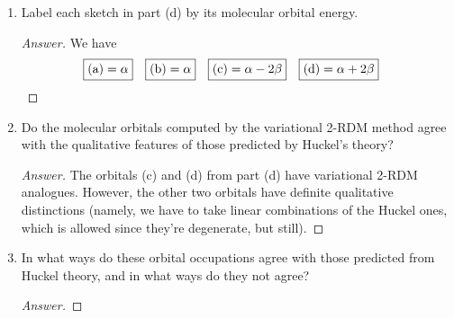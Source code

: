 \documentclass[../psets.tex]{subfiles}
\begin{document}
\begin{enumerate}
\begin{enumerate}
\begin{proof}[Answer]
\begin{figure}[h!]
\begin{subfigure}[b]{0.24\linewidth}
                    \caption{}
                \end{subfigure}
            \end{figure}
        \end{proof}
        \item Label each sketch in part (d) by its molecular orbital energy.
        \begin{proof}[Answer]
            We have
            \begin{align*}
                \Aboxed{\text{(a)} &= \alpha}&
                \Aboxed{\text{(b)} &= \alpha}&
                \Aboxed{\text{(c)} &= \alpha-2\beta}&
                \Aboxed{\text{(d)} &= \alpha+2\beta}
            \end{align*}
        \end{proof}
        \item Do the molecular orbitals computed by the variational 2-RDM method agree with the qualitative features of those predicted by Huckel's theory?
        \begin{proof}[Answer]
            The orbitals (c) and (d) from part (d) have variational 2-RDM analogues. However, the other two orbitals have definite qualitative distinctions (namely, we have to take linear combinations of the Huckel ones, which is allowed since they're degenerate, but still).
        \end{proof}
        \item In what ways do these orbital occupations agree with those predicted from Huckel theory, and in what ways do they not agree?
        \begin{proof}[Answer]

\end{proof}
\end{enumerate}
\end{enumerate}
\end{document}
